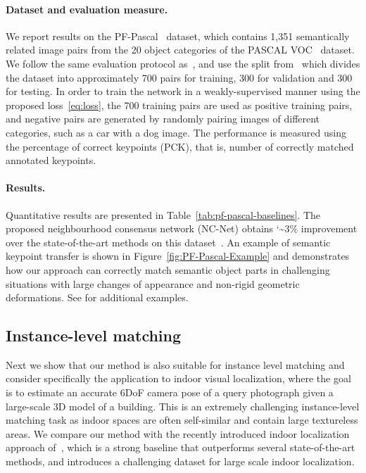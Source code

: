 \documentclass{article}
\begin{document}
\paragraph{Dataset and evaluation measure.}
We report results on the PF-Pascal~\cite{ham2017proposal} dataset, which contains 1,351 semantically related image pairs from the 20 object categories of the PASCAL VOC~\cite{pascal-voc-2011} dataset. We follow the same evaluation protocol as~\cite{scnet,Rocco18}, and use the split from~\cite{scnet} which divides the dataset into approximately 700 pairs for training, 300 for validation and 300 for testing. In order to train the network in a weakly-supervised manner using the proposed loss~\eqref{eq:loss}, the 700 training pairs are used as positive training pairs, and negative pairs are generated by randomly pairing images of different categories, such as a car with a dog image. The performance is measured using the percentage of correct keypoints (PCK), that is, number of correctly matched annotated keypoints. 
\paragraph{Results.}
Quantitative results are presented in Table~\ref{tab:pf-pascal-baselines}. The proposed neighbourhood consensus network (NC-Net) obtains {\char`\~}3\% improvement over the state-of-the-art methods on this dataset~\cite{Rocco18}. 
An example of semantic keypoint transfer is shown in Figure~\ref{fig:PF-Pascal-Example} and demonstrates how our approach can correctly match semantic object parts in challenging situations with large changes of appearance and non-rigid geometric deformations. See  for additional examples.
\subsection{Instance-level matching}
Next we show that our method is also suitable for instance level matching and consider specifically the application to indoor visual localization, where the goal is to estimate an accurate 6DoF camera pose of a query photograph given a large-scale 3D model of a building. This is an extremely challenging instance-level matching task as indoor spaces are often self-similar and contain large textureless areas. We compare our method with the recently introduced indoor localization approach of~\cite{Taira18}, which is a strong baseline that outperforms several state-of-the-art methods, and introduces a challenging dataset for large scale indoor localization. 
\end{document}

